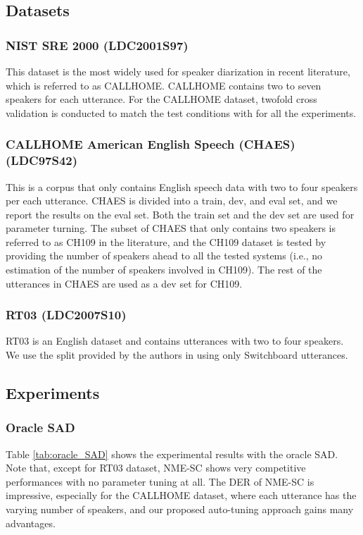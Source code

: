 \documentclass[journal]{IEEEtran}
\begin{document}
\vspace{-2.0ex}
\subsection{Datasets}

\subsubsection{NIST SRE 2000 (LDC2001S97)} This dataset is the most widely used for speaker diarization in recent literature, which is referred to as CALLHOME. CALLHOME contains two to seven speakers for each utterance. For the CALLHOME dataset, twofold cross validation is conducted to match the test conditions with \cite{snyder2018x, snyder_git} for all the experiments.
\subsubsection{CALLHOME American English Speech (CHAES) (LDC97S42)}  This is a corpus that only contains English speech data with two to four speakers per each utterance. CHAES is divided into a train, dev, and eval set, and we report the results on the eval set. Both the train set and the dev set are used for parameter turning. The subset of CHAES that only contains two speakers is referred to as CH109 in the literature, and the CH109 dataset is tested by providing the number of speakers ahead to all the tested systems  (i.e., no estimation of the number of speakers involved in CH109). The rest of the utterances in CHAES are used as a dev set for CH109.
\subsubsection{RT03 (LDC2007S10)} RT03 is an English dataset and contains utterances with two to four speakers. We use the split provided by the authors in \cite{wang2018speaker} using only Switchboard utterances. 


\vspace{-2.0ex}
\subsection{Experiments}
\subsubsection{Oracle SAD} Table \ref{tab:oracle_SAD} shows the experimental results with the oracle SAD.  Note that, except for RT03 dataset, NME-SC shows very competitive performances with no parameter tuning at all. The DER of NME-SC is impressive, especially for the CALLHOME dataset, where each utterance has the varying number of speakers, and our proposed auto-tuning approach gains many advantages. 
\end{document}
